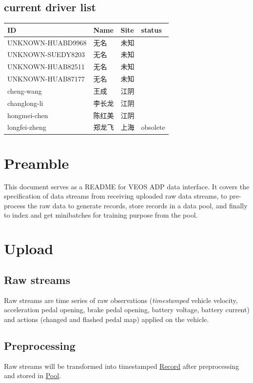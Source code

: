 \documentclass[a4paper, 11pt]{article}
\begin{document}
\subsection{current driver list}
\label{sec:org6c4ed3e}
\begin{center}
\begin{tabular}{llll}
ID & Name & Site & status\\
\hline
UNKNOWN-HUABD9968 & 无名 & 未知 & \\
UNKNOWN-SUEDY8203 & 无名 & 未知 & \\
UNKNOWN-HUAB82511 & 无名 & 未知 & \\
UNKNOWN-HUAB87177 & 无名 & 未知 & \\
cheng-wang & 王成 & 江阴 & \\
changlong-li & 李长龙 & 江阴 & \\
hongmei-chen & 陈红美 & 江阴 & \\
longfei-zheng & 郑龙飞 & 上海 & obsolete\\
\end{tabular}
\end{center}
\section{Preamble}
\label{sec:orgdf0bbed}

This document serves as a README for VEOS ADP data interface. It covers the specification of data streams from receiving uploaded raw data streams, to pre-process the raw data to generate records, store records in a data pool, and finally to index and get minibatches for training purpose from the pool.
\section{Upload}
\label{sec:org9e7585e}
\subsection{Raw streams}
\label{sec:org32328a2}
Raw streams are time series of raw observations (\emph{timestamped} vehicle velocity, acceleration pedal opening, brake pedal opening, battery voltage, battery current) and actions (changed and flashed pedal map) applied on the vehicle.
\subsection{Preprocessing}
\label{sec:org241ebd9}
Raw streams will be transformed into timestamped \hyperref[sec:orgf66f1ee]{Record} after preprocessing and stored in \hyperref[sec:org8b84fe0]{Pool}.
\end{document}

